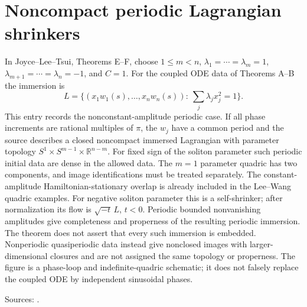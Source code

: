 \chapter{Noncompact periodic Lagrangian shrinkers}\label{sec:catalogue-jlt-mixed-periodic-shrinkers}
\begin{example}\label{ex:catalogue-jlt-mixed-periodic-shrinkers}
In Joyce--Lee--Tsui, Theorems E--F, choose $1\le m<n$, $\lambda_1=\cdots=\lambda_m=1$, $\lambda_{m+1}=\cdots=\lambda_n=-1$, and $C=1$. For the coupled ODE data of Theorems A--B the immersion is
\[
 L=\{(x_1w_1(s),\ldots,x_nw_n(s)):\ \sum_j\lambda_jx_j^2=1\}.
\]
This entry records the nonconstant-amplitude periodic case. If all phase increments are rational multiples of $\pi$, the $w_j$ have a common period and the source describes a closed noncompact immersed Lagrangian with parameter topology $S^1\times S^{m-1}\times\mathbb R^{n-m}$. For fixed sign of the soliton parameter such periodic initial data are dense in the allowed data. The $m=1$ parameter quadric has two components, and image identifications must be treated separately. The constant-amplitude Hamiltonian-stationary overlap is already included in the Lee--Wang quadric examples.
For negative soliton parameter this is a self-shrinker; after normalization its flow is $\sqrt{-t}\,L$, $t<0$.
Periodic bounded nonvanishing amplitudes give completeness and properness of the resulting periodic immersion. The theorem does not assert that every such immersion is embedded. Nonperiodic quasiperiodic data instead give nonclosed images with larger-dimensional closures and are not assigned the same topology or properness. The figure is a phase-loop and indefinite-quadric schematic; it does not falsely replace the coupled ODE by independent sinusoidal phases.
\par Sources: \cite{CatJoyceLeeTsui2010}.
\end{example}

